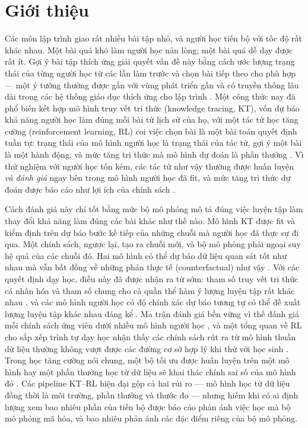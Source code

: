 \documentclass[a4paper,preprint,12pt,authoryear]{elsarticle}
\begin{document}
\section{Giới thiệu}\label{sec:intro}

Các môn lập trình giao rất nhiều bài tập nhỏ, và người học tiến bộ với tốc độ rất khác nhau. Một bài quá khó làm người học nản lòng; một bài quá dễ dạy được rất ít. Gợi ý bài tập thích ứng giải quyết vấn đề này bằng cách ước lượng trạng thái của từng người học từ các lần làm trước và chọn bài tiếp theo cho phù hợp — một ý tưởng thường được gắn với vùng phát triển gần \citep{vygotsky1978mind} và có truyền thống lâu dài trong các hệ thống giáo dục thích ứng cho lập trình \citep{brusilovsky2007user,hsiao2010guiding}. Một công thức nay đã phổ biến kết hợp mô hình truy vết tri thức (knowledge tracing, KT), vốn dự báo khả năng người học làm đúng mỗi bài từ lịch sử của họ, với một tác tử học tăng cường (reinforcement learning, RL) coi việc chọn bài là một bài toán quyết định tuần tự: trạng thái của mô hình người học là trạng thái của tác tử, gợi ý một bài là một hành động, và mức tăng tri thức mà mô hình dự đoán là phần thưởng \citep{huang2019dre,liu2019cseal,ai2019cdkt,chen2023src,li2023gehrl,ozyurt2025exrec}. Vì thử nghiệm với người học tốn kém, các tác tử như vậy thường được huấn luyện \emph{và đánh giá} ngay bên trong mô hình người học đã fit, và mức tăng tri thức dự đoán được báo cáo như lợi ích của chính sách \citep{cheng2026unier}.

Cách đánh giá này chỉ tốt bằng mức bộ mô phỏng mô tả đúng việc luyện tập làm thay đổi khả năng làm đúng các bài khác như thế nào. Mô hình KT được fit và kiểm định trên dự báo bước kế tiếp của những chuỗi mà người học đã thực sự đi qua. Một chính sách, ngược lại, tạo ra chuỗi mới, và bộ mô phỏng phải ngoại suy hệ quả của các chuỗi đó. Hai mô hình có thể dự báo dữ liệu quan sát tốt như nhau mà vẫn bất đồng về những phản thực tế (counterfactual) như vậy \citep{breiman2001two,damour2022underspecification}. Với các quyết định dạy học, điều này đã được nhận ra từ sớm: tham số truy vết tri thức cá nhân hóa và tham số chung cho cả quần thể hàm ý lượng luyện tập rất khác nhau \citep{lee2012individualizing}, và các mô hình người học có độ chính xác dự báo tương tự có thể đề xuất lượng luyện tập khác nhau đáng kể \citep{rollinson2015predictive}. Ma trận đánh giá bền vững vì thế đánh giá mỗi chính sách ứng viên dưới nhiều mô hình người học \citep{doroudi2017rem}, và một tổng quan về RL cho sắp xếp trình tự dạy học nhận thấy các chính sách rút ra từ mô hình thuần dữ liệu thường không vượt được các đường cơ sở hợp lý khi thử với học sinh \citep{doroudi2019reward}. Trong học tăng cường nói chung, một bộ tối ưu được huấn luyện trên một mô hình hay một phần thưởng học từ dữ liệu sẽ khai thác chính sai số của mô hình đó \citep{kurutach2018metrpo,janner2019trust,gao2023scaling}. Các pipeline KT--RL hiện đại gộp cả hai rủi ro — mô hình học từ dữ liệu đồng thời là môi trường, phần thưởng và thước đo — nhưng hiếm khi có ai định lượng xem bao nhiêu phần của tiến bộ được báo cáo phản ánh việc học mà bộ mô phỏng mã hóa, và bao nhiêu phản ánh các đặc điểm riêng của bộ mô phỏng.
\end{document}
